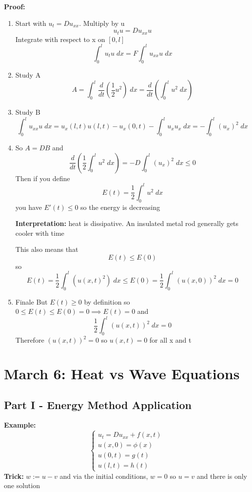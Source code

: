 \documentclass[12pt]{article}
\begin{document}
\textbf{Proof:}
\begin{enumerate}
    \item Start with $u_t = Du_{xx}$. Multiply by u 
    \[u_t u = Du_{xx}u\] 
    Integrate with respect to x on $[0, l]$
    \[\int_0^l u_t u \; dx = F \int_0^l u_{xx}u\; dx\]
    \item Study A 
    \[A = \int_0^l \frac{d}{dt}\left(\frac{1}{2}u^2\right) \; dx = \frac{d}{dt} \left(\int_0^l u^2 \; dx\right)\]
    \item Study B
    \[\int_0^l u_{xx} u\; dx = u_x(l, t)u(l, t) - u_x(0, t) - \int_0^l u_x u_x \; dx = -\int_0^l (u_x)^2\;dx\]

    \item So $A = DB$ and 
    \[\frac{d}{dt}\left(\frac{1}{2}\int_0^l u^2 \; dx\right) = -D\int_0^l (u_x)^2 \; dx \leq 0\]
    Then if you define 
    \[E(t) = \frac{1}{2}\int_0^l u^2 \; dx\]
    you have $E'(t) \leq 0$ so the energy is decreasing 

    \textbf{Interpretation:} heat is dissipative. An insulated metal rod generally gets cooler with time

    This also means that 
    \[E(t) \leq E(0)\]
    so 
    \[E(t) = \frac{1}{2}\int_0^l (u(x, t)^2)\; dx \leq E(0) = \frac{1}{2}\int_0^l (u(x, 0))^2\; dx = 0\]

    \item Finale
    But $E(t) \geq 0$ by definition so $0 \leq E(t) \leq E(0) = 0 \implies E(t) = 0$ and 
    \[\frac{1}{2}\int_0^l (u(x, t))^2\; dx = 0\]
    Therefore $(u(x, t))^2 =0$ so $u(x, t) = 0$ for all x and t
\end{enumerate}

\section{March 6: Heat vs Wave Equations}
\subsection*{Part I - Energy Method Application}
\textbf{Example:}
\[\begin{cases}
    u_t = Du_{xx} + f(x, t)\\
    u(x, 0) = \phi(x)\\
    u(0, t) = g(t)\\
    u(l, t) = h(t)
\end{cases}\]
\textbf{Trick:} $w := u - v$ and via the initial conditions, $w = 0$ so $u = v$ and there is only one solution
\end{document}
